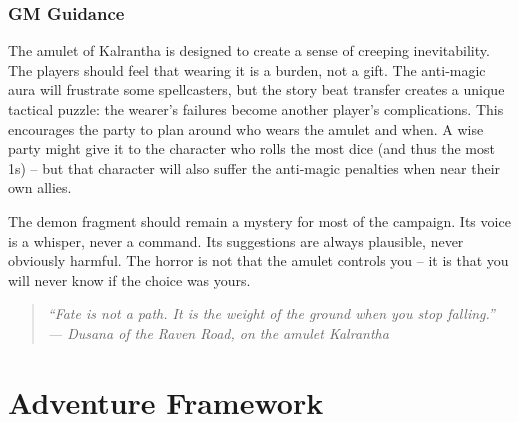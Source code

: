 \documentclass[11pt]{book}
\newenvironment{lorebox}{\begin{quote}\small\itshape}{\end{quote}}
\begin{document}
\subsection*{GM Guidance}
The amulet of Kalrantha is designed to create a sense of creeping inevitability. The players should feel that wearing it is a burden, not a gift. The anti‑magic aura will frustrate some spellcasters, but the story beat transfer creates a unique tactical puzzle: the wearer’s failures become another player’s complications. This encourages the party to plan around who wears the amulet and when. A wise party might give it to the character who rolls the most dice (and thus the most 1s) – but that character will also suffer the anti‑magic penalties when near their own allies.

The demon fragment should remain a mystery for most of the campaign. Its voice is a whisper, never a command. Its suggestions are always plausible, never obviously harmful. The horror is not that the amulet controls you – it is that you will never know if the choice was yours.

\begin{lorebox}
“Fate is not a path. It is the weight of the ground when you stop falling.”
--- \textit{Dusana of the Raven Road, on the amulet Kalrantha}
\end{lorebox}

\clearpage
\chapter{Adventure Framework}
\end{document}
